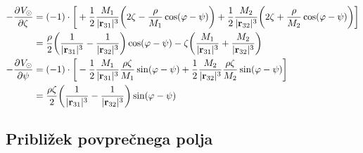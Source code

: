 \documentclass[12pt, a4paper]{article}
\renewcommand{\r}{
    \ensuremath{\mathbf{r}}
}
\newcommand{\der}[3][]{
    \ensuremath{ \frac{\partial^{#1} #2}{\partial #3^{#1}} }
}
\begin{document}
\begin{align}
    -\der{V_\odot}{\zeta} &= (-1)\cdot\bigg[+\frac{1}{2}\frac{M_1}{|\r_{31}|^3}\bigg(2\zeta -
        \frac{\rho}{M_1}\cos(\varphi - \psi)\bigg) + \frac{1}{2}\frac{M_2}{|\r_{32}|^3}
        \bigg(2\zeta + \frac{\rho}{M_2}\cos(\varphi - \psi)\bigg)\bigg] \notag \\
    &= \frac{\rho}{2}\bigg(\frac{1}{|\r_{31}|^3} - \frac{1}{|\r_{32}|^3}\bigg)\cos(\varphi - \psi) -
        \zeta\bigg(\frac{M_1}{|\r_{31}|^3} + \frac{M_2}{|\r_{32}|^3}\bigg) \\
        -\der{V_\odot}{\psi} &= (-1)\cdot\bigg[-\frac{1}{2}\frac{M_1}{|\r_{31}|^3}\frac{\rho\zeta}{M_1}\sin(\varphi - \psi)
        + \frac{1}{2}\frac{M_2}{|\r_{32}|^3}\frac{\rho\zeta}{M_2}\sin(\varphi - \psi) \bigg] \notag \\
    &= \frac{\rho\zeta}{2}\bigg(\frac{1}{|\r_{31}|^3} - \frac{1}{|\r_{32}|^3}\bigg)\sin(\varphi - \psi)
\end{align}

\subsection{Pribli\v zek povpre\v cnega polja}
\end{document}
